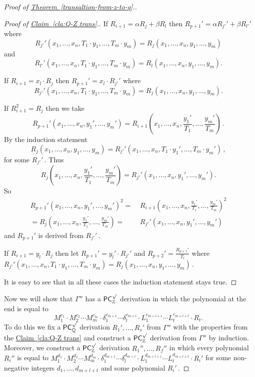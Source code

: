 \documentclass[11pt]{article}
\newcommand{\expref}[2]{\texorpdfstring{\hyperref[#2]{#1~\ref{#2}}}{#1~\ref{#2}}}
\newcommand{\Q}{{\mathbb Q}}
\newcommand{\Z}{{\mathbb Z}}
\begin{document}
\begin{proof}[Proof of \expref{Theorem}{transaltion-from-z-to-q}.]
\begin{proof}[Proof of \expref{Claim}{cla:Q-Z trans}.]
 If $R_{i + 1} = \alpha R_{j} + \beta R_l$ then $R_{p + 1}' = \alpha R_{j'}' + \beta R_{l'}'$ where 
$$
R_{j'}'(x_1, \ldots, x_n, T_1 \cdot y_1, \ldots, T_m \cdot y_m) = R_j(x_1, \ldots, x_n, y_1, \ldots, y_m)
$$ 
and 
$$
R_{l'}'(x_1, \ldots, x_n, T_1 \cdot y_1, \ldots, T_m \cdot y_m) = R_l(x_1, \ldots, x_n, y_1, \ldots, y_m).
$$ 

 If $R_{i + 1} = x_l \cdot R_j$ then $R_{p + 1}' = x_l \cdot R_{j'}'$ where 
$$
R_{j'}'(x_1, \ldots, x_n, T_1 \cdot y_1, \ldots, T_m \cdot y_m) = R_j(x_1, \ldots, x_n, y_1, \ldots, y_m).
$$ 

 If $R_{i + 1}^2 = R_j$ then we take 
$$
%
R_{p + 1}'(x_1, \ldots, x_n, y_1', \ldots, y_m') = R_{i + 1}(x_1, \ldots, x_n, \frac{y_1'}{T_1}, \ldots, \frac{y_m'}{T_m})\,. %
$$ By the induction statement  
$$
%
R_{j}(x_1, \ldots, x_n, y_1, \ldots, y_m) = R_{j'}'(x_1, \ldots, x_n, T_1 \cdot y_1', \ldots, T_m \cdot y_m')\,, %
$$
for some %
$R_{j'}'\,.$ %
 Thus
$$
R_{j}(x_1, \ldots, x_n, \frac{y_1'}{T_1}, \ldots, \frac{y_m'}{T_m}) = R_{j'}'(x_1, \ldots, x_n, y_1', \ldots,y_m').
$$
So 
\begin{align*}
    R_{p + 1}'(x_1, \ldots, x_n, y_1', \ldots, y_m')^2 =& \;R_{i + 1}(x_1, \ldots, x_n, \frac{y_1'}{T_1}, \ldots, \frac{y_m'}{T_m})^2  \\ = R_{j}(x_1, \ldots, x_n, \frac{y_1'}{T_1}, \ldots, \frac{y_m'}{T_m}) =&  \; R_{j'}'(x_1, \ldots, x_n, y_1', \ldots,y_m')
\end{align*}
and $R_{p + 1}'$ is derived from %
$R_{j'}'\,.$ %

 If $R_{i + 1} = y_l \cdot R_j$ then let $R_{p + 1}' = y_l' \cdot R_{j'}'$ and $R_{p + 2}' = \frac{R_{p + 1}'}{T_l}$ where %
$R_{j'}'(x_1, \ldots, x_n, T_1 \cdot y_1, \ldots, T_m \cdot y_m) = R_j(x_1, \ldots, x_n, y_1, \ldots, y_m)\,.$ %

%
It is easy to see that in all these cases the induction statement stays true. %
\end{proof}

Now we will show that $\Gamma''$ has a $\mathsf{PC}_{\Z}^{\surd}$ derivation in which the polynomial at %
the end is equal to 
$$
M_1^{c_1} \cdot M_2^{c_2} \cdots M_m^{c_m} \cdot \delta_1^{c_{m + 1}} \cdots \delta_l^{c_{m + l}} \cdot  L_1^{c_{m + l + 1}} \cdots L_t^{c_{m + l + t}}  \cdot R_t.
$$
To do this we fix a $\mathsf{PC}_{\Q}^{\surd}$ derivation %
$R_1', \ldots, R_s'$ %
 from $\Gamma''$ with the properties from the \expref{Claim}{cla:Q-Z trans} and construct a $\mathsf{PC}_{\Z}^{\surd}$ derivation from $\Gamma''$ by induction. Moreover, we construct a $\mathsf{PC}_{\Z}^{\surd}$ derivation %
$R_1'', \ldots, R_f''$ %
 in which every polynomial $R_i''$ is equal to $M_1^{d_1} \cdot M_2^{d_2} \cdots M_m^{d_m} \cdot \delta_1^{d_{m + 1}} \cdots \delta_l^{d_{m + l}} \cdot  L_1^{d_{m + l + 1}} \cdots L_t^{d_{m + l + t}} \cdot R_i'$ for some non-negative integers $d_1, \ldots, d_{m + l + t}$ and some polynomial %
$R_i'\,.$ %


\end{proof}
\end{document}
